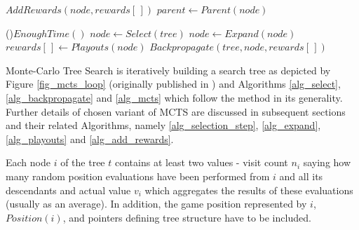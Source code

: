 \begin{algorithm}
\DontPrintSemicolon
\caption{$Backpropagate(tree, node, rewards[\,])$
\label{alg_backpropagate}}
$AddRewards(node, rewards[\,])$\;
$parent \leftarrow Parent(node)$\;
\end{algorithm}

\begin{algorithm}
\DontPrintSemicolon
\caption{$MCTSLoop(tree)$\label{alg_mcts}}
\While(){$EnoughTime()$}{
    $node \leftarrow Select(tree)$ \;
    $node \leftarrow Expand(node)$ \;
    $rewards[\,] \leftarrow Playouts(node)$ \;
    $Backpropagate(tree,node,rewards[\,])$ \;
}
 \;
\end{algorithm}



Monte-Carlo Tree Search is iteratively building a search tree as depicted by Figure
\ref{fig_mcts_loop} (originally published in \cite{ChaslotPhd2010}) and Algorithms 
\ref{alg_select}, \ref{alg_backpropagate} and \ref{alg_mcts}
which follow the method in its generality. Further details of chosen variant of MCTS
are discussed in subsequent sections and their related Algorithms, namely \ref{alg_selection_step},
\ref{alg_expand}, \ref{alg_playouts} and \ref{alg_add_rewards}.

Each node $i$ of the tree $t$ contains at least two values - visit count $n_i$
saying how many random position evaluations have been performed from $i$ and all its
descendants and
actual value $v_i$ which aggregates the results of these evaluations (usually as an average).
In addition, the game position represented by $i$, $Position(i)$, and pointers defining
tree structure have to be included. 

